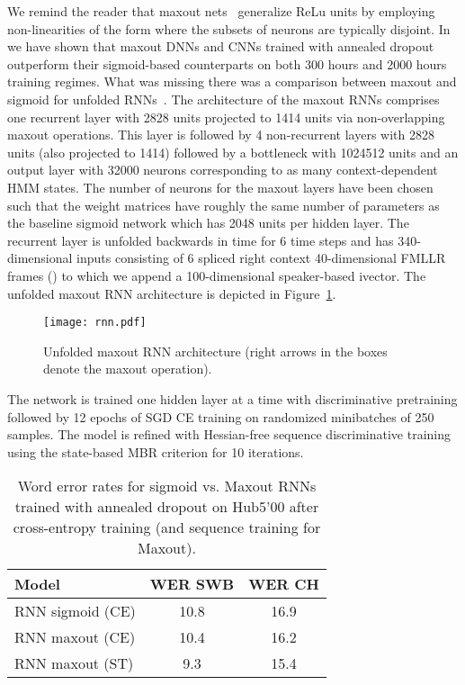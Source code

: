 \documentclass[a4paper]{article}
\begin{document}
We remind the reader that maxout nets~\cite{goodfellow13} generalize
ReLu units by employing non-linearities of the form  where the subsets of
neurons  are typically disjoint. In~\cite{saon15} we have shown
that maxout DNNs and CNNs trained with annealed dropout outperform
their sigmoid-based counterparts on both 300 hours and 2000 hours
training regimes. What was missing there was a comparison between
maxout and sigmoid for unfolded RNNs~\cite{saon14}. The architecture
of the maxout RNNs comprises one recurrent layer with 2828 units
projected to 1414 units via non-overlapping  maxout
operations. This layer is followed by 4 non-recurrent layers with 2828
units (also projected to 1414) followed by a bottleneck with
1024512 units and an output layer with 32000 neurons
corresponding to as many context-dependent HMM states.  The number of
neurons for the maxout layers have been chosen such that the weight
matrices have roughly the same number of parameters as the baseline
sigmoid network which has 2048 units per hidden layer. The recurrent
layer is unfolded backwards in time for 6 time steps  and
has 340-dimensional inputs consisting of 6 spliced right context
40-dimensional FMLLR frames () to which we append a
100-dimensional speaker-based ivector. The unfolded maxout RNN
architecture is depicted in Figure~\ref{rnn}.

\begin{figure}[htpb!]
\centerline{\texttt{[image: rnn.pdf]}}
\caption{\label{rnn} Unfolded maxout RNN architecture (right arrows in the boxes denote the maxout operation).}
\end{figure}

The network is trained one hidden layer at a
time with discriminative pretraining followed by 12 epochs of SGD CE
training on randomized minibatches of 250 samples. The model is refined with
Hessian-free sequence discriminative training~\cite{bedk12} using the state-based
MBR criterion for 10 iterations.

\begin{table}[htpb!]
\begin{center}
\begin{tabular}{|l|c|c|} \hline
     Model   & WER SWB & WER CH      \\ \hline
RNN sigmoid (CE) & 10.8 & 16.9        \\ \hline
RNN maxout  (CE) & 10.4 & 16.2 \\ \hline
RNN maxout  (ST) & 9.3  & 15.4 \\ \hline
\end{tabular}
\end{center}
\caption{\label{maxout}
Word error rates for sigmoid vs. Maxout RNNs trained with
annealed dropout on Hub5'00 after cross-entropy training (and sequence training for Maxout).}
\end{table}
\end{document}
